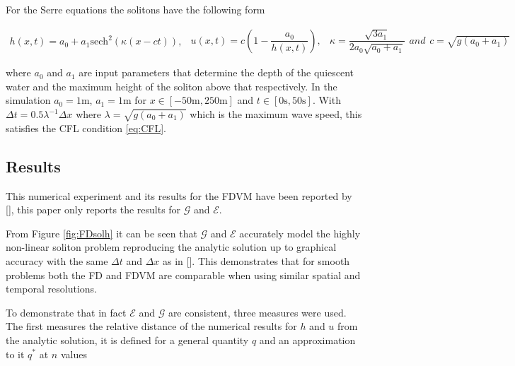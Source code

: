 \documentclass[SingleSpace,12pt,Journal]{Serre_ASCE}
\begin{document}
For the Serre equations the solitons have the following form
\begin{linenomath*}
\begin{subequations}
\begin{gather}
h\left(x,t\right) = a_0 + a_1\text{sech}^2\left( \kappa\left(x - ct\right)\right),
\end{gather}
\begin{gather}
u\left(x,t\right) = c\left(1 - \dfrac{a_0}{h(x,t)} \right),
\end{gather}
\begin{gather}
\kappa = \dfrac{\sqrt{3a_1}}{2a_0 \sqrt{ a_0 + a_1}}
\end{gather}
and
\begin{gather}
c = \sqrt{g \left(a_0 + a_1\right)}
\end{gather}
\end{subequations}
\label{eq:sol}
\end{linenomath*}
where $a_0$ and $a_1$ are input parameters that determine the depth of the quiescent water and the maximum height of the soliton above that respectively. In the simulation $a_0 = 1\text{m}$, $a_1 = 1\text{m}$ for $x\in\left[-50\text{m},250\text{m}\right]$ and $t\in\left[0\text{s},50\text{s}\right]$. With $\Delta t = 0.5 \lambda^{-1} \Delta x$ where $\lambda = \sqrt{g \left(a_0 + a_1\right)}$ which is the maximum wave speed, this satisfies the CFL condition \eqref{eq:CFL}. 

\subsection{Results}
This numerical experiment and its results for the FDVM have been reported by [], this paper only reports the results for $\mathcal{G}$ and $\mathcal{E}$. 

From Figure \ref{fig:FDsolh} it can be seen that $\mathcal{G}$ and $\mathcal{E}$ accurately model the highly non-linear soliton problem reproducing the analytic solution up to graphical accuracy with the same $\Delta t$ and $\Delta x$ as in []. This demonstrates that for smooth problems both the FD and FDVM are comparable when using similar spatial and temporal resolutions. 

To demonstrate that in fact $\mathcal{E}$ and $\mathcal{G}$ are consistent, three measures were used. The first measures the relative distance of the numerical results for $h$ and $u$ from the analytic solution, it is defined for a general quantity $q$ and an approximation to it $q^*$ at $n$ values
\end{document}
